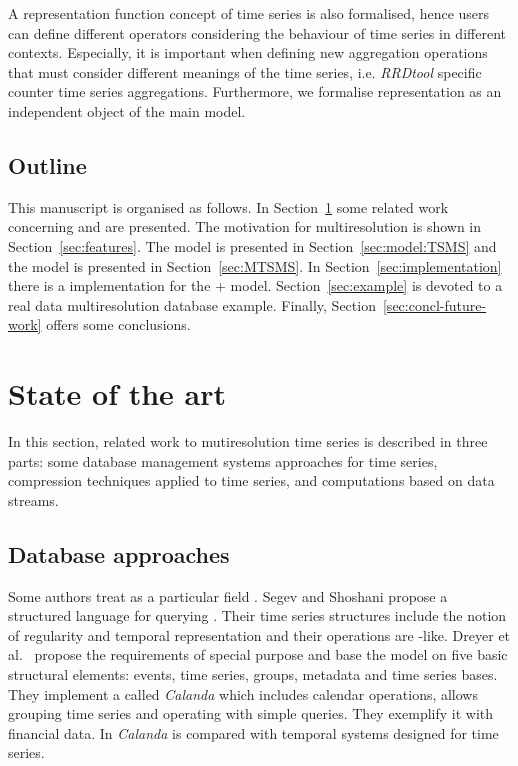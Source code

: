 A representation function concept of time series is also formalised, hence
users can define different operators considering the behaviour of time
series in different contexts. Especially, it is important when defining
new aggregation operations that must consider different meanings of
the time series, i.e. \emph{RRDtool} specific counter time series
aggregations. Furthermore, we formalise representation as an
independent object of the main model.




\subsection{Outline}

This manuscript is organised as follows.  In
Section~\ref{sec:related-work} some related work concerning
 and  are presented.  The motivation for
multiresolution is shown in Section~\ref{sec:features}.  The
 model is presented in Section~\ref{sec:model:TSMS} and the
 model is presented in Section~\ref{sec:MTSMS}.  In
Section~\ref{sec:implementation} there is a implementation
for the + model.  Section~\ref{sec:example} is
devoted to a real data multiresolution database example.  Finally,
Section~\ref{sec:concl-future-work} offers some conclusions.





\section{State of the art}
\label{sec:related-work}

In this section, related work to mutiresolution time series is
described in three parts: some database management systems
approaches for time series, compression techniques applied to time
series, and computations based on data streams.




\subsection{Database approaches}

Some authors treat  as a particular  field
\cite{last01}.  Segev and Shoshani \cite{segev87:sigmod} propose a
structured language for querying . Their time series
structures include the notion of regularity and temporal
representation and their operations are -like.  Dreyer et
al.\ \cite{dreyer94} propose the requirements of special purpose
 and base the model on five basic structural elements:
events, time series, groups, metadata and time series bases. They
implement a  called \emph{Calanda} which includes calendar
operations, allows grouping time series and operating with simple
queries. They exemplify it with financial data. In \cite{schmidt95}
\emph{Calanda} is compared with temporal systems designed for time
series.



